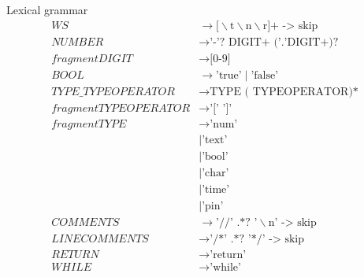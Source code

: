 Lexical grammar
\begin{align*}
    WS                      & \to \text{[}\backslash \text{t} \backslash \text{n} \backslash \text{r]+ -> skip}     \\
    NUMBER                  & \to \text{'-'? DIGIT+ ('.'DIGIT+)?}                                                   \\
    fragment DIGIT          & \to \text{[0-9]}                                                                      \\
    BOOL                    & \to \text{'true'} \mid \text{'false'}                                                 \\
    TYPE\_TYPEOPERATOR       & \to \text{TYPE ( TYPEOPERATOR)*}                                                     \\
    fragment TYPEOPERATOR   & \to \text{'[' ']'}                                                                    \\
    fragment TYPE           & \to \text{'num'}                                                                      \\
                            & \mid \text{'text'}                                                                    \\
                            & \mid \text{'bool'}                                                                    \\
                            & \mid \text{'char'}                                                                    \\
                            & \mid \text{'time'}                                                                    \\
                            & \mid \text{'pin'}                                                                    \\
    COMMENTS                & \to \text{'//' .*? '} \backslash \text{n' -> skip}                                    \\
    LINECOMMENTS            & \to \text{'/*' .*? '*/' -> skip}                                                      \\
    RETURN                  & \to \text{'return'}                                                                   \\
    WHILE                   & \to \text{'while'}                                                                    \\

\end{align*}
